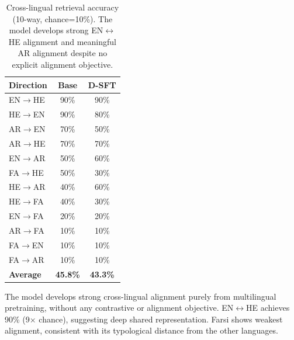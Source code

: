 \documentclass[10pt,twocolumn]{article}
\begin{document}
\begin{table}[H]
\centering\small
\begin{tabular}{lcc}
\toprule
\textbf{Direction} & \textbf{Base} & \textbf{D-SFT} \\
\midrule
EN$\rightarrow$HE & 90\% & 90\% \\
HE$\rightarrow$EN & 90\% & 80\% \\
AR$\rightarrow$EN & 70\% & 50\% \\
AR$\rightarrow$HE & 70\% & 70\% \\
EN$\rightarrow$AR & 50\% & 60\% \\
FA$\rightarrow$HE & 50\% & 30\% \\
HE$\rightarrow$AR & 40\% & 60\% \\
HE$\rightarrow$FA & 40\% & 30\% \\
EN$\rightarrow$FA & 20\% & 20\% \\
AR$\rightarrow$FA & 10\% & 10\% \\
FA$\rightarrow$EN & 10\% & 10\% \\
FA$\rightarrow$AR & 10\% & 10\% \\
\midrule
\textbf{Average} & \textbf{45.8\%} & \textbf{43.3\%} \\
\bottomrule
\end{tabular}
\caption{Cross-lingual retrieval accuracy (10-way, chance=10\%). The model develops strong EN$\leftrightarrow$HE alignment and meaningful AR alignment despite no explicit alignment objective.}
\label{tab:embeddings}
\end{table}

The model develops strong cross-lingual alignment purely from multilingual pretraining, without any contrastive or alignment objective. EN$\leftrightarrow$HE achieves 90\% (9$\times$ chance), suggesting deep shared representation. Farsi shows weakest alignment, consistent with its typological distance from the other languages.
\end{document}
